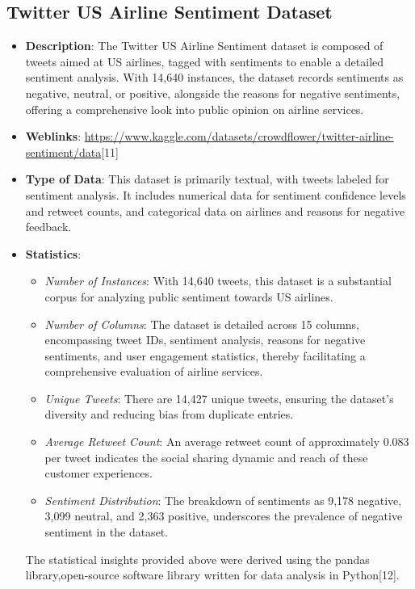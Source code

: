 \documentclass[conference]{IEEEtran}
\begin{document}
\subsection{Twitter US Airline Sentiment Dataset}
\begin{itemize}
    \item \textbf{Description}: The Twitter US Airline Sentiment dataset is composed of tweets aimed at US airlines, tagged with sentiments to enable a detailed sentiment analysis. With 14,640 instances, the dataset records sentiments as negative, neutral, or positive, alongside the reasons for negative sentiments, offering a comprehensive look into public opinion on airline services.
    
    \item \textbf{Weblinks}: \url{https://www.kaggle.com/datasets/crowdflower/twitter-airline-sentiment/data}[11]
    
    \item \textbf{Type of Data}: This dataset is primarily textual, with tweets labeled for sentiment analysis. It includes numerical data for sentiment confidence levels and retweet counts, and categorical data on airlines and reasons for negative feedback.
    
    \item \textbf{Statistics}:
    \begin{itemize}
        \item \textit{Number of Instances}: With 14,640 tweets, this dataset is a substantial corpus for analyzing public sentiment towards US airlines.
        \item \textit{Number of Columns}: The dataset is detailed across 15 columns, encompassing tweet IDs, sentiment analysis, reasons for negative sentiments, and user engagement statistics, thereby facilitating a comprehensive evaluation of airline services.
        \item \textit{Unique Tweets}: There are 14,427 unique tweets, ensuring the dataset's diversity and reducing bias from duplicate entries.
        \item \textit{Average Retweet Count}: An average retweet count of approximately 0.083 per tweet indicates the social sharing dynamic and reach of these customer experiences.
        \item \textit{Sentiment Distribution}: The breakdown of sentiments as 9,178 negative, 3,099 neutral, and 2,363 positive, underscores the prevalence of negative sentiment in the dataset.
    \end{itemize}
    The statistical insights provided above were derived using the pandas library,open-source software library written for data analysis in Python[12].

\end{itemize}
\end{document}
